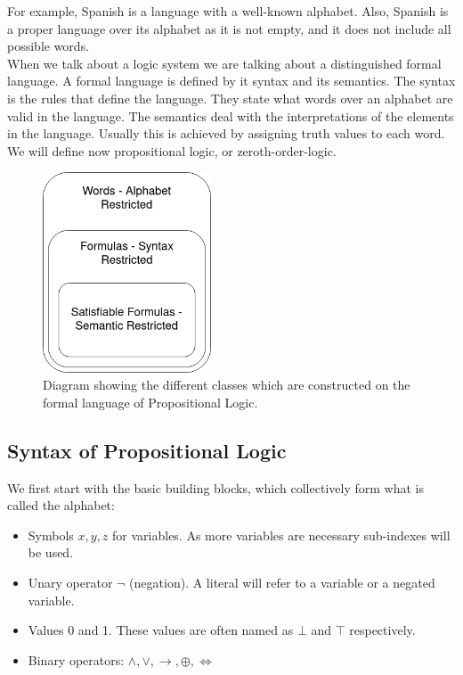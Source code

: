 For example, Spanish is a language with a well-known alphabet. Also, Spanish is a proper language over its alphabet as it is not empty, and it does not include all possible words.\\

When we talk about a logic system we are talking about a distinguished formal language. A formal language is defined by it syntax and its semantics. The syntax is the rules that define the language. They state what words over an alphabet are valid in the language. The semantics deal with the interpretations of the elements in the language. Usually this is achieved by assigning truth values to each word.\\

We will define now propositional logic, or zeroth-order-logic. \\

\begin{figure}[h]
  \begin{center}
    \includegraphics[width=5cm]{figures/sintax2.png}
    \caption{Diagram showing the different classes which are constructed on the formal language of Propositional Logic.}
  \end{center}
\end{figure} 

\subsection{Syntax of Propositional Logic}
We first start with the basic building blocks, which collectively form what is called the alphabet:
\begin{itemize}
\item Symbols $x,y,z$ for variables. As more variables are necessary sub-indexes will be used.
\item Unary operator $\neg$ (negation). A literal will refer to a variable or a negated variable.
  
\item Values 0 and 1. These values are often named as $\bot$ and $\top$ respectively.

\item Binary operators: $\wedge, \vee, \rightarrow, \oplus, \iff $
\end{itemize}


